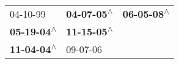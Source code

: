 \begin{supertabular}{lll}
                  04-10-99\textsuperscript{} &  \textbf{04-07-05\textsuperscript{$\wedge$}} &  \textbf{06-05-08\textsuperscript{$\wedge$}} \\
 \textbf{05-19-04\textsuperscript{$\wedge$}} &  \textbf{11-15-05\textsuperscript{$\wedge$}} &                                              \\
 \textbf{11-04-04\textsuperscript{$\wedge$}} &                   09-07-06\textsuperscript{} &                                              \\
\end{supertabular}
